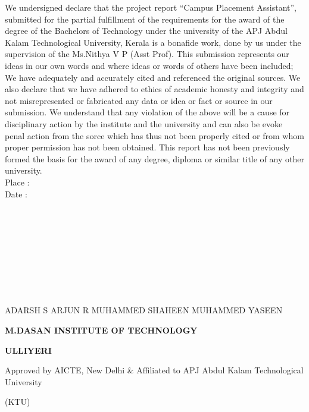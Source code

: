 \documentclass[12pt]{article}
\begin{document}
\begin{changemargin}{0.5cm}{0.5cm}
We undersigned declare that the project report “Campus Placement Assistant”, submitted for the partial fulfillment of the requirements for
the award of the degree of the Bachelors of Technology under the university of
the APJ Abdul Kalam Technological University, Kerala is a bonafide work,
done by us under the supervision of the Ms.Nithya V P (Asst Prof). This
submission represents our ideas in our own words and where ideas or words
of others have been included; We have adequately and accurately cited and
referenced the original sources. We also declare that we have adhered to ethics
of academic honesty and integrity and not misrepresented or fabricated any
data or idea or fact or source in our submission. We understand that any
violation of the above will be a cause for disciplinary action by the
institute and the university and can also be evoke penal action from the sorce
which has thus not been properly cited or from whom proper permission has
not been obtained. This report has not been previously formed the basis for
the award of any degree, diploma or similar title of any other university.
\\Place :
\\Date :
\\
\\
\\
\\
\\
\\
\\
\\
\\
\\
 ADARSH S\hspace{3mm}   ARJUN R \hspace{3mm}  MUHAMMED SHAHEEN \hspace{3mm}   MUHAMMED YASEEN

\thispagestyle{empty}

\newpage
\vspace*{1px}
\begin{center}\large\bf{M.DASAN INSTITUTE OF TECHNOLOGY}\end{center}
\begin{center}\large\bf{ULLIYERI} \end{center}
\begin{center}Approved by AICTE, New Delhi \& Affiliated to APJ Abdul Kalam Technological University\end{center}
\begin{center}(KTU)\end{center}


\end{changemargin}
\end{document}
